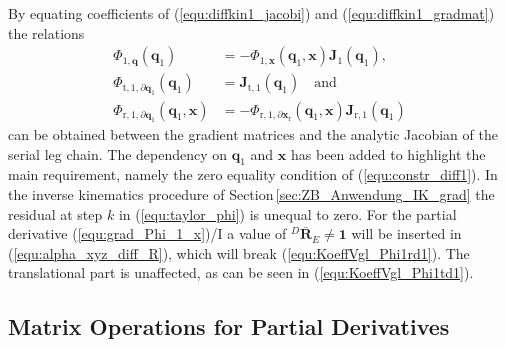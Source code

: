 \documentclass[robotics,article,accept,moreauthors,pdftex]{Definitions/mdpi}
\newcommand{\bm}[1]{\boldsymbol{#1}}
\newcommand{\rotmato}[2]{{{ }^{#1}\boldsymbol{\overline{R}}}_{#2}}
\let\Phi\varPhi
\begin{document}
%
By equating coefficients of (\ref{equ:diffkin1_jacobi}) and (\ref{equ:diffkin1_gradmat}) the relations
%
\begin{align}
\bm{\Phi}_{1,\bm{q}}(\bm{q}_1)
&=
-\bm{\Phi}_{1,\bm{x}}(\bm{q}_1,\bm{x})
\bm{J}_1(\bm{q}_1),
\label{equ:KoeffVgl_Phi1d1}
\\
\bm{\Phi}_{\mathrm{t},1,\partial\bm{q}_1}(\bm{q}_1)
&=
\bm{J}_{\mathrm{t},1}(\bm{q}_1)\quad\mathrm{and}
\label{equ:KoeffVgl_Phi1td1}
\\
\bm{\Phi}_{\mathrm{r},1,\partial\bm{q}_1}(\bm{q}_1,\bm{x})
&=
-\bm{\Phi}_{\mathrm{r},1,\partial\bm{x}_\mathrm{r}}(\bm{q}_1,\bm{x}) \bm{J}_{\mathrm{r},1}(\bm{q}_1)
\label{equ:KoeffVgl_Phi1rd1}
\end{align}
%
can be obtained between the gradient matrices and the analytic Jacobian of the serial leg chain.
The dependency on $\bm{q}_1$ and $\bm{x}$ has been added to highlight the main requirement, namely the zero equality condition of (\ref{equ:constr_diff1}).
In the inverse kinematics procedure of Section\,\ref{sec:ZB_Anwendung_IK_grad} the residual at step $k$ in (\ref{equ:taylor_phi}) is unequal to zero.
For the partial derivative (\ref{equ:grad_Phi_1_x})/I a value of $\rotmato{D}{E} \ne \bm{1}$ will be inserted in (\ref{equ:alpha_xyz_diff_R}), which will break (\ref{equ:KoeffVgl_Phi1rd1}).
The translational part is unaffected, as can be seen in (\ref{equ:KoeffVgl_Phi1td1}).

\subsection{Matrix Operations for Partial Derivatives}
\label{sec:appendix_gradient_matrix}
\end{document}
